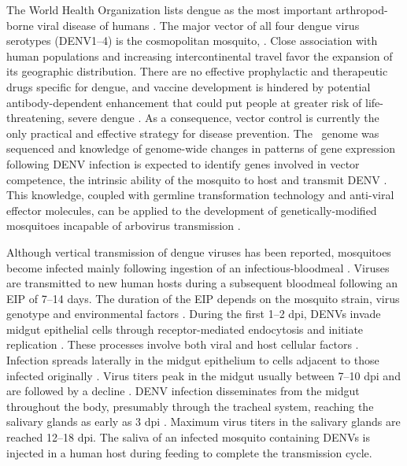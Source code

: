 The World Health Organization lists dengue as the most important arthropod-borne viral disease of humans \cite{WHO2009}.
The major vector of all four dengue virus serotypes (\gls{DENV}1–4) is the cosmopolitan mosquito, \Aea.
Close association with human populations and increasing intercontinental travel favor the expansion of its geographic distribution.
There are no effective prophylactic and therapeutic drugs specific for dengue, and vaccine development is hindered by potential antibody-dependent enhancement that could put people at greater risk of life-threatening, severe dengue \cite{Gubler2002}.
As a consequence, vector control is currently the only practical and effective strategy for disease prevention.
The \Aa\ genome was sequenced and knowledge of genome-wide changes in patterns of gene expression following \gls{DENV} infection is expected to identify genes involved in vector competence, the intrinsic ability of the mosquito to host and transmit \gls{DENV} \cite{Nene2007,Kramer2003}.
This knowledge, coupled with germline transformation technology and anti-viral effector molecules, can be applied to the development of genetically-modified mosquitoes incapable of arbovirus transmission \cite{James2007,Franz2006,Mathur2010}.

Although vertical transmission of dengue viruses has been reported, mosquitoes become infected mainly following ingestion of an infectious-bloodmeal \cite{Gunther2007,Angel2008}.
Viruses are transmitted to new human hosts during a subsequent bloodmeal following an \gls{EIP} of 7–14 days.
The duration of the \gls{EIP} depends on the mosquito strain, virus genotype and environmental factors \cite{Watts1987,Black2002,Anderson2006,Salazar2007,Lambrechts2011}.
During the first 1–2 \gls{dpi}, \gls{DENV}s invade midgut epithelial cells through receptor-mediated endocytosis and initiate replication \cite{Bennett2002,Heinz2003,Rey2003,Mercado-Curiel2008}.
These processes involve both viral and host cellular factors \cite{Samsa2009}.
Infection spreads laterally in the midgut epithelium to cells adjacent to those infected originally \cite{Salazar2007}.
Virus titers peak in the midgut usually between 7–10 \gls{dpi} and are followed by a decline \cite{Salazar2007,Xi2008}.
\gls{DENV} infection disseminates from the midgut throughout the body, presumably through the tracheal system, reaching the salivary glands as early as 3 \gls{dpi} \cite{Salazar2007}.
Maximum virus titers in the salivary glands are reached 12–18 \gls{dpi}.
The saliva of an infected mosquito containing \gls{DENV}s is injected in a human host during feeding to complete the transmission cycle.

